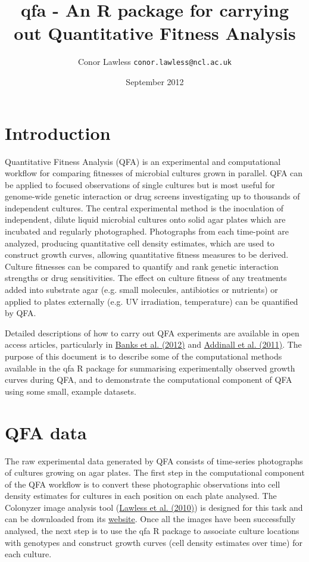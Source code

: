 \documentclass [a4paper]{article}
\title{qfa - An R package for carrying out Quantitative Fitness Analysis}
\author{Conor Lawless \texttt{conor.lawless@ncl.ac.uk}}
\date{September 2012}
\begin{document}
\maketitle

\section{Introduction}

Quantitative Fitness Analysis (QFA) is an experimental and computational workflow for comparing fitnesses of microbial cultures grown in parallel.  QFA can be applied to focused observations of single cultures but is most useful for genome-wide genetic interaction or drug screens investigating up to thousands of independent cultures.  The central experimental method is the inoculation of independent, dilute liquid microbial cultures onto solid agar plates which are incubated and regularly photographed.  Photographs from each time-point are analyzed, producing quantitative cell density estimates, which are used to construct growth curves, allowing quantitative fitness measures to be derived.  Culture fitnesses can be compared to quantify and rank genetic interaction strengths or drug sensitivities. The effect on culture fitness of any treatments added into substrate agar (e.g. small molecules, antibiotics or nutrients) or applied to plates externally (e.g. UV irradiation, temperature) can be quantified by QFA.

Detailed descriptions of how to carry out QFA experiments are available in open access articles, particularly in \href{http://dx.doi.org/10.3791/4018}{Banks et al. (2012)} and  \href{http://dx.doi.org/10.1371/journal.pgen.1001362}{Addinall et al. (2011)}.  The purpose of this document is to describe some of the computational methods available in the qfa R package for summarising experimentally observed growth curves during QFA, and to demonstrate the computational component of QFA using some small, example datasets.

\section{QFA data}

The raw experimental data generated by QFA consists of time-series photographs of cultures growing on agar plates.  The first step in the computational component of the QFA workflow is to convert these photographic observations into cell density estimates for cultures in each position on each plate analysed.  The Colonyzer image analysis tool (\href{http://dx.doi.org/10.1186/1471-2105-11-287}{Lawless et al. (2010)}) is designed for this task and can be downloaded from its \href{http://research.ncl.ac.uk/colonyzer/}{website}.  Once all the images have been successfully analysed, the next step is to use the qfa R package to associate culture locations with genotypes and construct growth curves (cell density estimates over time) for each culture.
\end{document}
